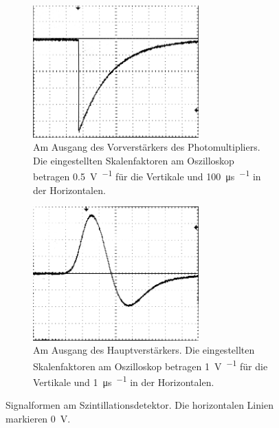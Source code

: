 \documentclass[11pt, a4paper]{article}
\numberwithin{equation}{section}
\begin{document}
\begin{figure}[h]
	\centering
	\begin{subfigure}[b]{0.7\textwidth}
		\centering
		\includegraphics[width=0.7\textwidth]{./figures/signale/vor_szinti_abgeschnitten.jpg}
		\caption{Am Ausgang des Vorverstärkers des Photomultipliers. Die eingestellten Skalenfaktoren am Oszilloskop betragen \SI{0.5}{\volt\per\division} für die Vertikale und \SI{100}{\micro\second\per\division} in der Horizontalen.}
		\label{fig:signal_szinti_vor}
	\end{subfigure}
	
	\begin{subfigure}[b]{0.7\textwidth}
		\centering
		\includegraphics[width=0.7\textwidth]{./figures/signale/haupt_szinti_abgeschnitten.jpg}
		\caption{Am Ausgang des Hauptverstärkers. Die eingestellten Skalenfaktoren am Oszilloskop betragen \SI{1}{\volt\per\division} für die Vertikale und \SI{1}{\micro\second\per\division} in der Horizontalen.}
		\label{fig:signal_szinti_haupt}
	\end{subfigure}
	\caption{Signalformen am Szintillationsdetektor. Die horizontalen Linien markieren \SI{0}{\volt}.}
\end{figure}
\end{document}
